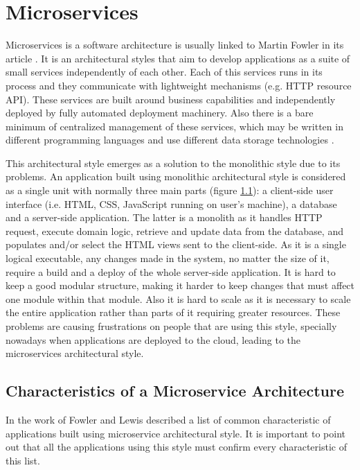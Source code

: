 \section{Microservices}

Microservices is a software architecture is usually linked to Martin Fowler in its article \cite{Fowler2014}. It is an architectural styles that aim to develop applications as a suite of small services independently of each other. Each of this services runs in its process and they communicate with lightweight mechanisms (e.g. HTTP resource API). These services are built around business capabilities and independently deployed by fully automated deployment machinery. Also there is a bare minimum of centralized management of these services, which may be written in different programming languages and use different data storage technologies \cite{Fowler2014}.

This architectural style emerges as a solution to the monolithic style due to its problems. An application built using monolithic architectural style is considered as a single unit with normally three main parts (figure \ref{}): a client-side user interface (i.e. HTML, CSS, JavaScript running on user's machine), a database and a server-side application. The latter is a monolith as it handles HTTP request, execute domain logic, retrieve and update data from the database, and populates and/or select the HTML views sent to the client-side. As it is a single logical executable, any changes made in the system, no matter the size of it, require a build and a deploy of the whole server-side application. It is hard to keep a good modular structure, making it harder to keep changes that must affect one module within that module. Also it is hard to scale as it is necessary to scale the entire application rather than parts of it requiring greater resources. These problems are causing frustrations on people that are using this style, specially nowadays when applications are deployed to the cloud, leading to the microservices architectural style.

\subsection{Characteristics of a Microservice Architecture}
In the work of Fowler and Lewis \cite{Fowler2014} described a list of common characteristic of applications built using microservice architectural style. It is important to point out that all the applications using this style must confirm every characteristic of this list.

